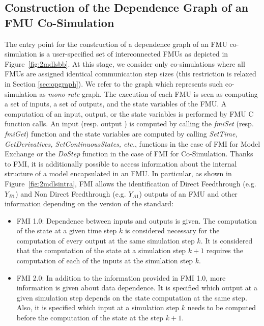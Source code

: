\subsection{Construction of the Dependence Graph of an FMU Co-Simulation}

The entry point for the construction of a dependence graph of an FMU co-simulation is a user-specified set of interconnected FMUs as depicted in Figure~\ref{fig:2mdlsbb}. At this stage, we consider only co-simulations where all FMUs are assigned identical communication step sizes (this restriction is relaxed in Section \ref{sec:opgraph}). We refer to the graph which represents such co-simulation as \textit{mono-rate} graph. The execution of each FMU is seen as computing a set of inputs, a set of outputs, and the state variables of the FMU. A computation of an input, output, or the state variables is performed by FMU C function calls. An input (resp. output ) is computed by calling the \textit{fmiSet} (resp. \textit{fmiGet}) function and the state variables are computed by calling \textit{SetTime, GetDerivatives, SetContinuousStates, etc.}, functions in the case of FMI for Model Exchange or the \textit{DoStep} function in the case of FMI for Co-Simulation. Thanks to FMI, it is additionally possible to access information about the internal structure of a model encapsulated in an FMU. In particular, as shown in Figure~\ref{fig:2mdlsintra}, FMI allows the identification of Direct Feedthrough (e.g. $Y_{B1}$) and Non Direct Feedthrough (e.g. $Y_{A1}$) outputs of an FMU and other information depending on the version of the standard:

\begin{itemize}
\item FMI 1.0: Dependence between inputs and outputs is given. The computation of the state at a given time step $k$ is considered necessary for the computation of every output at the same simulation step $k$. It is considered that the computation of the state at a simulation step $k+1$ requires the computation of each of the inputs at the simulation step $k$.
\item FMI 2.0: In addition to the information provided in FMI 1.0, more information is given about data dependence. It is specified which output at a given simulation step depends on the state computation at the same step. Also, it is specified which input at a simulation step $k$ needs to be computed before the computation of the state at the step $k+1$.  
\end{itemize}

